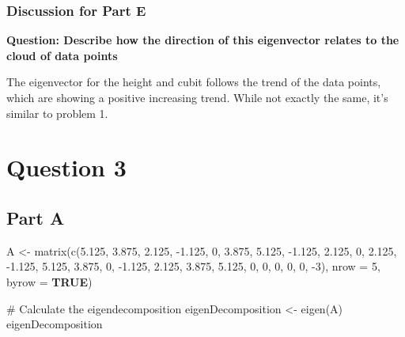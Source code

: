 \documentclass[
  letterpaper,
  DIV=11,
  numbers=noendperiod]{scrartcl}
\newenvironment{Shaded}{}{}
\newcommand{\AttributeTok}[1]{\textcolor[rgb]{0.84,0.60,0.13}{#1}}
\newcommand{\CommentTok}[1]{\textcolor[rgb]{0.57,0.51,0.45}{#1}}
\newcommand{\ConstantTok}[1]{\textcolor[rgb]{0.69,0.38,0.53}{\textbf{#1}}}
\newcommand{\DecValTok}[1]{\textcolor[rgb]{0.96,0.45,0.00}{#1}}
\newcommand{\FloatTok}[1]{\textcolor[rgb]{0.96,0.45,0.00}{#1}}
\newcommand{\FunctionTok}[1]{\textcolor[rgb]{0.41,0.62,0.42}{#1}}
\newcommand{\NormalTok}[1]{\textcolor[rgb]{0.24,0.22,0.21}{#1}}
\newcommand{\OtherTok}[1]{\textcolor[rgb]{0.41,0.62,0.42}{#1}}
\newcommand{\SpecialCharTok}[1]{\textcolor[rgb]{0.69,0.38,0.53}{#1}}
\begin{document}
\hypertarget{discussion-for-part-e-1}{%
\subsubsection{Discussion for Part E}\label{discussion-for-part-e-1}}

\textbf{Question: Describe how the direction of this eigenvector relates
to the cloud of data points}

The eigenvector for the height and cubit follows the trend of the data
points, which are showing a positive increasing trend. While not exactly
the same, it's similar to problem 1.

\newpage{}

\hypertarget{question-3}{%
\section{Question 3}\label{question-3}}

\hypertarget{part-a-2}{%
\subsection{Part A}\label{part-a-2}}

\begin{Shaded}
\begin{Highlighting}[]
\NormalTok{A }\OtherTok{\textless{}{-}} \FunctionTok{matrix}\NormalTok{(}\FunctionTok{c}\NormalTok{(}\FloatTok{5.125}\NormalTok{, }\FloatTok{3.875}\NormalTok{, }\FloatTok{2.125}\NormalTok{, }\SpecialCharTok{{-}}\FloatTok{1.125}\NormalTok{, }\DecValTok{0}\NormalTok{,}
              \FloatTok{3.875}\NormalTok{, }\FloatTok{5.125}\NormalTok{, }\SpecialCharTok{{-}}\FloatTok{1.125}\NormalTok{, }\FloatTok{2.125}\NormalTok{, }\DecValTok{0}\NormalTok{,}
              \FloatTok{2.125}\NormalTok{, }\SpecialCharTok{{-}}\FloatTok{1.125}\NormalTok{, }\FloatTok{5.125}\NormalTok{, }\FloatTok{3.875}\NormalTok{, }\DecValTok{0}\NormalTok{,}
              \SpecialCharTok{{-}}\FloatTok{1.125}\NormalTok{, }\FloatTok{2.125}\NormalTok{, }\FloatTok{3.875}\NormalTok{, }\FloatTok{5.125}\NormalTok{, }\DecValTok{0}\NormalTok{,}
              \DecValTok{0}\NormalTok{, }\DecValTok{0}\NormalTok{, }\DecValTok{0}\NormalTok{, }\DecValTok{0}\NormalTok{, }\SpecialCharTok{{-}}\DecValTok{3}\NormalTok{), }
            \AttributeTok{nrow =} \DecValTok{5}\NormalTok{, }
            \AttributeTok{byrow =} \ConstantTok{TRUE}\NormalTok{)}

\CommentTok{\# Calculate the eigendecomposition}
\NormalTok{eigenDecomposition }\OtherTok{\textless{}{-}} \FunctionTok{eigen}\NormalTok{(A)}
\NormalTok{eigenDecomposition}
\end{Highlighting}
\end{Shaded}
\end{document}
